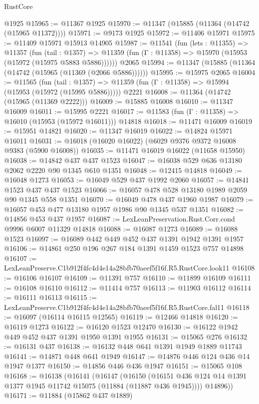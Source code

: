 \begin{lexlean}{RustCore}
\begin{coremodule}
    @1925
@15965 := @11367 @1925
@15970 := @11347 (@15885 (@11364 (@14742 (@15965 @11372))))
@15971 := @9173 @1925
@15972 := @11406 @15971
@15975 := @11409 @15971 @15913 @14905
@15987 := @11541
    (fun (lets : @11355) =>
    @11357
      (fun (tail : @1357) =>
      @11359 (fun (Γ : @11358) => @15970 (@15953 (@15972 (@15975 @5883 @5886))))))
    @2065
@15994 := @11347 (@15885 (@11364 (@14742 (@15965 (@11369 (@2066 @5886))))))
@15995 := @15975 @2065
@16004 := @11565
    (fun (tail : @1357) => @11359 (fun (Γ : @11358) => @15994 (@15953 (@15972 (@15995 @5886)))))
    @2221
@16008 := @11364 (@14742 (@15965 (@11369 @2222)))
@16009 := @15885 @16008
@16010 := @11347 @16009
@16011 := @15995 @2221
@16017 := @11583 (fun (Γ : @11358) => @16010 (@15953 (@15972 @16011))) @14818
@16018 := @11471 @16009
@16019 := @15951 @14821
@16020 := @11347 @16019
@16022 := @14824 @15971 @16011
@16031 := @16018 (@16020 @16022) (@6029 @9376 @9372 @16008 @9383 (@5900 @16008))
@16035 := @11471 @16019 @16022 (@11658 @15950)
@16038 := @14842 @437 @437 @1523
@16047 := @16038 @529 @636 @13180 @2062 @2220 @90 @1345 @610 @1351
@16048 := @12415 @14818
@16049 := @16048 @1273
@16053 := @16049 @529 @437 @1992 @2060
@16057 := @14841 @1523 @437 @437 @1523
@16066 := @16057 @478 @528 @13180 @1989 @2059 @90 @1345 @558 @1351
@16070 := @16049 @478 @437 @1960 @1987
@16079 := @16057 @453 @477 @13180 @1957 @1986 @90 @1345 @537 @1351
@16082 := @14856 @453 @437 @1957
@16087 := LexLeanPreservation.Rust.Corr.cond @9996 @6007 @11329 @14818
@16088 := @16087 @1273
@16089 := @16088 @1523
@16097 := @16089 @442 @449 @452 @437 @1391 @1942 @1391 @1957
@16106 := @14861 @250 @196 @267 @184 @1391 @1459 @1523 @757 @14898
@16107 := LexLeanPreserve.C1b912f4fc4d4e14a28bfb70aeef5f16f.R5.RustCore.look11
@16108 := @16106 @16107
@16109 := @11391 @757
@16110 := @11899 @16109
@16111 := @16108 @16110
@16112 := @11414 @757
@16113 := @11903 @16112
@16114 := @16111 @16113
@16115 := LexLeanPreserve.C1b912f4fc4d4e14a28bfb70aeef5f16f.R5.RustCore.fal11
@16118 := @16097 (@16114 @16115 @12565)
@16119 := @12466 @14818
@16120 := @16119 @1273
@16122 := @16120 @1523 @12470
@16130 := @16122 @1942 @449 @452 @437 @1391 @1950 @1391 @1955
@16131 := @15065 @276
@16132 := @16131 @437
@16138 := @16132 @448 @641 @1391 @1949 @1889 @11743
@16141 := @14871 @448 @641 @1949
@16147 := @14876 @446 @124 @436 @14 @1947 @1377
@16150 := @14856 @446 @436 @1947
@16151 := @15065 @108
@16168 := @16138
    (@16141
      (@16147
        (@16150 (@16151 @436 @124 @14 @1391 @1377 @1945 @11742 @15075 (@11884 (@11887 @436 @1945))))
        @14896))
@16171 := @11884 (@15862 @437 @1889)

\end{coremodule}
\end{lexlean}
